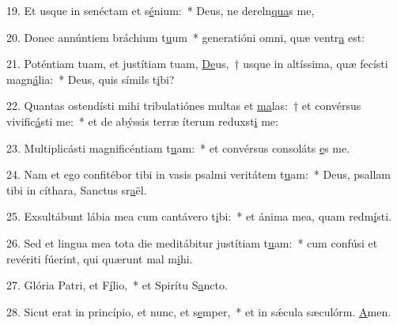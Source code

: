 19. Et usque in senéctam et s\uline{é}nium:~* Deus, ne dereln\uline{qua}s me,\par 
20. Donec annúntiem bráchium t\uline{u}um~* generatióni omni, quæ ventr\uline{a} est:\par 
21. Poténtiam tuam, et justítiam tuam, \uline{De}us,~† usque in altíssima, quæ fecísti magn\uline{á}lia:~* Deus, quis símils t\uline{i}bi?\par 
22. Quantas ostendísti mihi tribulatiónes multas et \uline{ma}las:~† et convérsus vivific\uline{á}sti me:~* et de abýssis terræ íterum reduxst\uline{i} me:\par 
23. Multiplicásti magnificéntiam t\uline{u}am:~* et convérsus consoláts \uline{e}s me.\par 
24. Nam et ego confitébor tibi in vasis psalmi veritátem t\uline{u}am:~* Deus, psallam tibi in cíthara, Sanctus sr\uline{a}ël.\par 
25. Exsultábunt lábia mea cum cantávero t\uline{i}bi:~* et ánima mea, quam redm\uline{í}sti.\par 
26. Sed et lingua mea tota die meditábitur justítiam t\uline{u}am:~* cum confúsi et revériti fúerint, qui quærunt mal m\uline{i}hi.\par 
27. Glória Patri, et F\uline{í}lio,~* et Spirítu S\uline{a}ncto.\par 
28. Sicut erat in princípio, et nunc, et s\uline{e}mper,~* et in sǽcula sæculórm. \uline{A}men.\par 
